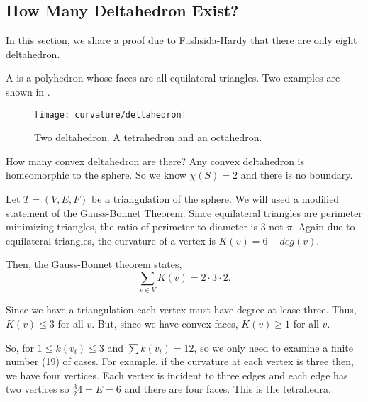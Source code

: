 \subsection{How Many Deltahedron Exist?}
\label{sec:deltahedron}

In this section, we share a proof due to
Fushsida-Hardy \cite{deltahedron} that there are
only eight deltahedron.

A  is a polyhedron whose
faces are all equilateral triangles. Two examples are shown
in .


\begin{figure}[htb]
\centering
\texttt{[image: curvature/deltahedron]}
\caption{Two deltahedron. A tetrahedron and an octahedron.}
\label{fig:deltahedron}
\end{figure}

How many convex deltahedron are there?
Any convex deltahedron is homeomorphic to the sphere.
So we know $\chi(S)=2$ and there is no boundary.

Let $T=(V,E,F)$  be a triangulation of the sphere.
We will used a modified statement of the Gauss-Bonnet Theorem.
Since equilateral triangles are perimeter minimizing triangles,
the ratio of perimeter to diameter is $3$ not $\pi$.
Again due to equilateral triangles, the curvature of a vertex
is $K(v)=6-deg(v).$

Then, the Gauss-Bonnet theorem
states,
$$\sum_{v\in V}K(v)=2\cdot  3\cdot 2.$$

Since we have a triangulation each
vertex must have degree at lease three.
Thus, $K(v)\leq 3$ for all $v$. But, since we have
convex faces, $K(v)\geq 1$ for all $v$.

So, for $1\leq k(v_i)\leq 3$ and  $\sum k(v_i)=12$,
so we only need to examine a finite number (19) of cases.
For example, if the curvature at each vertex is three then,
we have four vertices. Each vertex is incident to three edges
and each edge has two vertices so $\frac{3}{2}4=E=6$ and
there are four faces. This is the tetrahedra.




